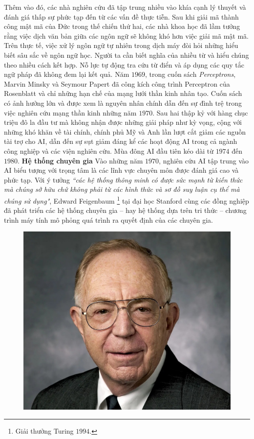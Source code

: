 \begin{multicols}{2}
	\vskip 0.1cm
	Thêm vào đó, các nhà nghiên cứu đã tập trung nhiều vào khía cạnh lý thuyết và đánh giá thấp sự phức tạp đến từ các vấn đề thực tiễn. Sau khi giải mã thành công mật mã của Đức trong thế chiến thứ hai, các nhà khoa học đã lầm tưởng rằng việc dịch văn bản giữa các ngôn ngữ sẽ không khó hơn việc giải mã mật mã. Trên thực tế, việc xử lý ngôn ngữ tự nhiên trong dịch máy đòi hỏi những hiểu biết sâu sắc về ngôn ngữ học. Người ta cần biết nghĩa của nhiều từ và hiểu chúng theo nhiều cách kết hợp. Nỗ lực tự động tra cứu từ điển và áp dụng các quy tắc ngữ pháp đã không đem lại kết quả. 
	\vskip 0.1cm
	Năm $1969$, trong cuốn sách \textit{Perceptrons}, Marvin Minsky và Seymour Papert đã công kích công trình Perceptron của Rosenblatt và chỉ những hạn chế của mạng lưới thần kinh nhân tạo. Cuốn sách có ảnh hưởng lớn và được xem là nguyên nhân chính dẫn đến sự đình trệ trong việc nghiên cứu mạng thần kinh những năm $1970$.
	\vskip 0.1cm
	Sau hai thập kỷ với hàng chục triệu đô la đầu tư mà không nhận được những giải pháp như kỳ vọng, cộng với những khó khăn về tài chính, chính phủ Mỹ và Anh lần lượt cắt giảm các nguồn tài trợ cho AI, dẫn đến sự sụt giảm đáng kể các hoạt động AI trong cả ngành công nghiệp và các viện nghiên cứu. Mùa đông AI đầu tiên kéo dài từ $1974$ đến $1980$.
	\vskip 0.1cm
	\textbf{\color{cackithi}Hệ thống chuyên gia}
	\vskip 0.1cm
	Vào những năm $1970$, nghiên cứu AI tập trung vào AI biểu tượng với trọng tâm là các lĩnh vực chuyên môn được đánh giá cao và phức tạp. Với ý tưởng \textit{``các hệ thống thông minh có được sức mạnh từ kiến thức mà chúng sở hữu chứ không phải từ các hình thức và sơ đồ suy luận cụ thể mà chúng sử dụng"}, Edward Feigenbaum \footnote{\color{cackithi}Giải thưởng Turing $1994$.} tại đại học Stanford cùng các đồng nghiệp đã phát triển các hệ thống chuyên gia -- hay hệ thống dựa trên tri thức -- chương trình máy tính mô phỏng quá trình ra quyết định của các chuyên gia. 
	\begin{figure}[H]
		\vspace*{-5pt}
		\centering
		\captionsetup{labelformat= empty, justification=centering}
		\includegraphics[width= 1\linewidth]{Edward-Feigenbaum.jpeg}

\end{figure}
\end{multicols}
